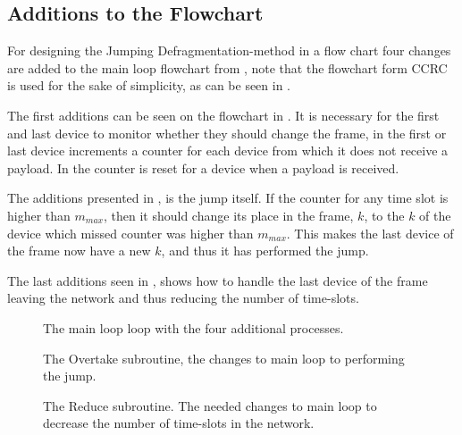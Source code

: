 \subsection{Additions to the Flowchart}
For designing the Jumping Defragmentation-method in a flow chart four changes are added to the main loop flowchart from , note that the flowchart form CCRC is used for the sake of simplicity, as can be seen in .

The first additions can be seen on the flowchart in .
It is necessary for the first and last device to monitor whether they should change the frame, in  the first or last device increments a counter for each device from which it does not receive a payload.
In  the counter is reset for a device when a payload is received.

The additions presented in , is the jump itself.
If the counter for any time slot is higher than $m_{max}$, then it should change its place in the frame, $k$, to the $k$ of the device which missed counter was higher than $m_{max}$.
This makes the last device of the frame now have a new $k$, and thus it has performed the jump.	

The last additions seen in , shows how to handle the last device of the frame leaving the network and thus reducing the number of time-slots.
                                                                         
\begin{figure}[!p] 
\vspace{-15pt} 
\centering
\footnotesize

\caption{The main loop loop with the four additional processes.}
\label{fig:mainFrameDefrag}   
\end{figure}  

  

\begin{figure}[!p]
\centering
\footnotesize

\caption{The Overtake subroutine, the changes to main loop to performing the jump.}
\label{fig:jd2}    
\end{figure}

\begin{figure}[!p]
\centering
\footnotesize

\caption{The Reduce subroutine. The needed changes to main loop to decrease the number of time-slots in the network.}
\label{fig:jd3}    
\end{figure}   
